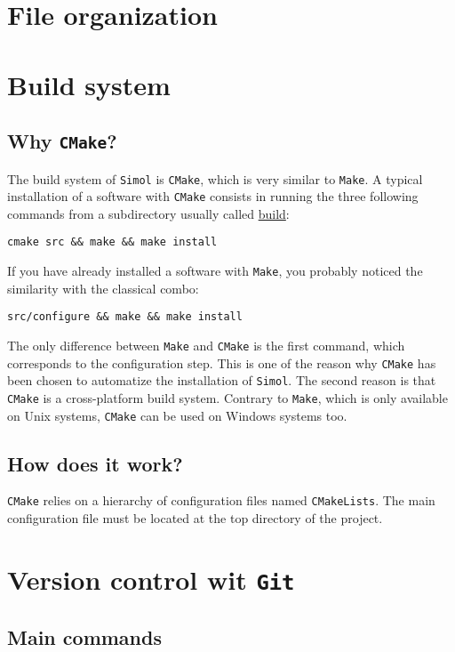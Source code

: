\documentclass[12pt]{book}
\newcommand{\CMake}{\texttt{CMake}\xspace}
\newcommand{\CMakeLists}{\texttt{CMakeLists}\xspace}
\newcommand{\Git}{\texttt{Git}\xspace}
\newcommand{\Make}{\texttt{Make}\xspace}
\newcommand{\Simol}{\texttt{Simol}\xspace}
\begin{document}
\section{File organization}
\section{Build system}

\subsection{Why \CMake?}

The build system of \Simol is \CMake, which is very similar to \Make. A typical installation of a software with \CMake consists in running the three following commands from a subdirectory usually called \url{build}: 
\lstset{language=bash} 
\begin{lstlisting}
cmake src && make && make install
\end{lstlisting}
If you have already installed a software with \Make, you probably noticed the similarity with the classical combo:
\lstset{language=bash} 
\begin{lstlisting}
src/configure && make && make install
\end{lstlisting}
The only difference between \Make and \CMake is the first command, which corresponds to the configuration step. This is one of the reason why \CMake has been chosen to automatize the installation of \Simol. The second reason is that \CMake is a cross-platform build system. Contrary to \Make, which is only available on Unix systems, \CMake can be used on Windows systems too.

\subsection{How does it work?}

\CMake relies on a hierarchy of configuration files named \CMakeLists. The main configuration file must be located at the top directory of the project.







\section{Version control wit \Git}


\subsection{Main commands}
\end{document}
